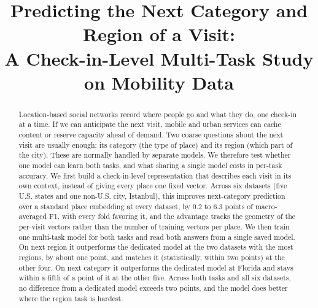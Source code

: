 \documentclass[conference]{IEEEtran}
\begin{document}
\title{Predicting the Next Category and Region of a Visit:\\
A Check-in-Level Multi-Task Study on Mobility Data}

\author{
}

\maketitle

\begin{abstract}
Location-based social networks record where people go and what they
do, one check-in at a time. If we can anticipate the next visit, mobile and
urban services can cache content or reserve capacity ahead of demand. Two coarse questions about the next
visit are usually enough: its category (the type of place) and its region (which
part of the city). These are normally handled by separate models. We therefore
test whether one model can learn both tasks, and what sharing a single model costs
in per-task accuracy. We first
build a check-in-level representation that describes each visit in its own
context, instead of giving every place one fixed vector. Across six datasets
(five U.S. states and one non-U.S. city, Istanbul), this improves next-category
prediction over a standard place embedding at every dataset, by $0.2$ to $6.3$ points of
macro-averaged F1, with every fold favoring it,
and the advantage tracks the geometry of the per-visit vectors rather than the number of training vectors per place. We then train one
multi-task model for both tasks and read both answers from a single saved
model. On next region it outperforms the dedicated model at the two datasets
with the most regions, by about one point, and matches it (statistically,
within two points) at the other four. On next category it outperforms the
dedicated model at Florida and stays within a fifth of a point of it at the
other five. Across both tasks and all six datasets, no difference from a dedicated
model exceeds two points, and the model does better where the region task is
hardest.
\end{abstract}
\end{document}
